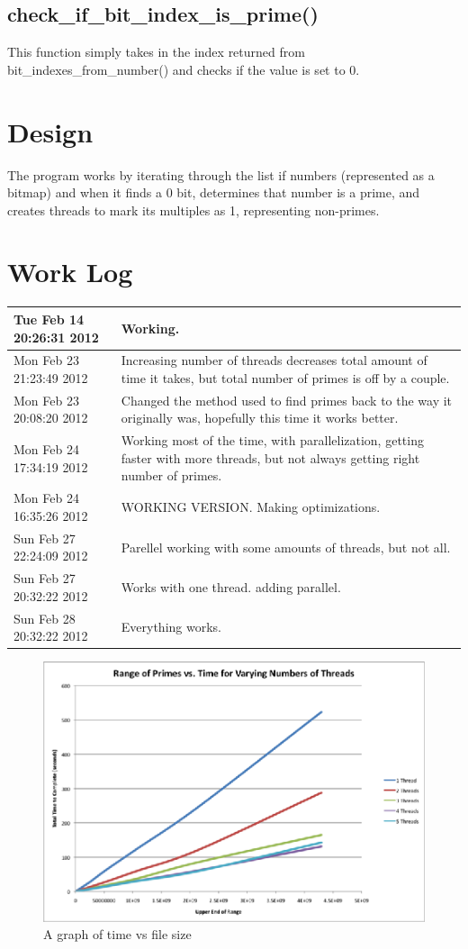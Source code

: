 \documentclass[letterpaper,10pt,onecolumn,titlepage]{article}
\begin{document}
	\subsection{check\_if\_bit\_index\_is\_prime()}
	This function simply takes in the index returned from bit\_indexes\_from\_number() and checks if the value is set to 0.


\section{Design}
	The program works by iterating through the list if numbers (represented as a bitmap) and when it finds a 0 bit, determines that number is a prime, and creates threads to mark its multiples as 1, representing non-primes.

\section {Work Log}
\begin{center}
    \begin{tabular}{ | l | p{5cm} |}
    \hline


Tue Feb 14 20:26:31 2012 & Working. \\ \hline
Mon Feb 23 21:23:49 2012 & Increasing number of threads decreases total amount of time it takes, but total number of primes is off by a couple. \\ \hline
Mon Feb 23 20:08:20 2012  & Changed the method used to find primes back to the way it originally was, hopefully this time it works better. \\ \hline
Mon Feb 24 17:34:19 2012 & Working most of the time, with parallelization, getting faster with more threads, but not always getting right number of primes. \\ \hline
Mon Feb 24 16:35:26 2012 & WORKING VERSION.  Making optimizations. \\ \hline
Sun Feb 27 22:24:09 2012 & Parellel working with some amounts of threads, but not all. \\ \hline
Sun Feb 27 20:32:22 2012 & Works with one thread.  adding parallel. \\ \hline
Sun Feb 28 20:32:22 2012 & Everything works. \\ \hline
    \end{tabular}
\end{center}

\begin{figure}[b]
	\centering
 	\includegraphics{graph}
	  \caption{A graph of time vs file size}
\end{figure}
\end{document}
